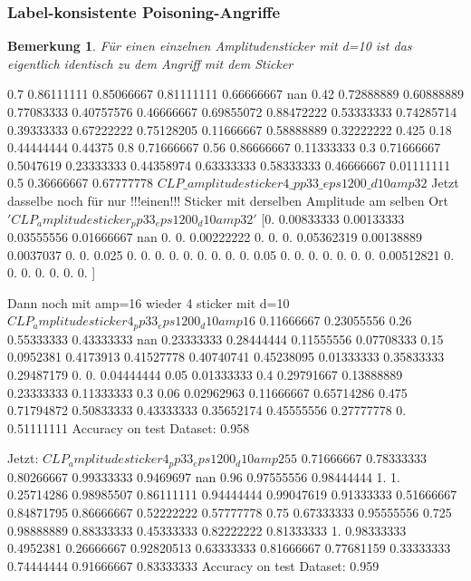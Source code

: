 \documentclass[11pt,a4paper]{article}
\newtheorem{remark}[theorem]{Bemerkung}
\numberwithin{equation}{section}
\begin{document}
	\subsubsection{Label-konsistente Poisoning-Angriffe}

	
	\begin{remark}
		Für einen einzelnen Amplitudensticker mit d=10 ist das eigentlich identisch zu dem Angriff mit dem Sticker
	\end{remark}
	0.7        0.86111111 0.85066667 0.81111111 0.66666667        nan
	0.42       0.72888889 0.60888889 0.77083333 0.40757576 0.46666667
	0.69855072 0.88472222 0.53333333 0.74285714 0.39333333 0.67222222
	0.75128205 0.11666667 0.58888889 0.32222222 0.425      0.18
	0.44444444 0.44375    0.8        0.71666667 0.56       0.86666667
	0.11333333 0.3        0.71666667 0.5047619  0.23333333 0.44358974
	0.63333333 0.58333333 0.46666667 0.01111111 0.5        0.36666667
	0.67777778
	$CLP\_amplitudesticker4\_pp33\_eps1200\_d10amp32$
	Jetzt dasselbe noch für nur !!!einen!!! Sticker mit derselben Amplitude am selben Ort
	$'CLP_amplitudesticker_pp33_eps1200_d10amp32'$
	[0.         0.00833333 0.00133333 0.03555556 0.01666667        nan
	0.         0.         0.00222222 0.         0.         0.
	0.05362319 0.00138889 0.0037037  0.         0.         0.025
	0.         0.         0.         0.         0.         0.
	0.         0.         0.         0.05       0.         0.
	0.         0.         0.         0.         0.         0.00512821
	0.         0.         0.         0.         0.         0.
	0.        ]
	
	Dann noch mit amp=16 wieder 4 sticker mit d=10
	$CLP_amplitudesticker4_pp33_eps1200_d10amp16$
	0.11666667 0.23055556 0.26       0.55333333 0.43333333        nan
	0.23333333 0.28444444 0.11555556 0.07708333 0.15       0.0952381
	0.4173913  0.41527778 0.40740741 0.45238095 0.01333333 0.35833333
	0.29487179 0.         0.         0.04444444 0.05       0.01333333
	0.4        0.29791667 0.13888889 0.23333333 0.11333333 0.3
	0.06       0.02962963 0.11666667 0.65714286 0.475      0.71794872
	0.50833333 0.43333333 0.35652174 0.45555556 0.27777778 0.
	0.51111111
	Accuracy on test Dataset: 0.958 
	
	Jetzt: $CLP_amplitudesticker4_pp33_eps1200_d10amp255$
	0.71666667 0.78333333 0.80266667 0.99333333 0.9469697         nan
	0.96       0.97555556 0.98444444 1.         1.         0.25714286
	0.98985507 0.86111111 0.94444444 0.99047619 0.91333333 0.51666667
	0.84871795 0.86666667 0.52222222 0.57777778 0.75       0.67333333
	0.95555556 0.725      0.98888889 0.88333333 0.45333333 0.82222222
	0.81333333 1.         0.98333333 0.4952381  0.26666667 0.92820513
	0.63333333 0.81666667 0.77681159 0.33333333 0.74444444 0.91666667
	0.83333333
	Accuracy on test Dataset: 0.959 
	
\end{document}
